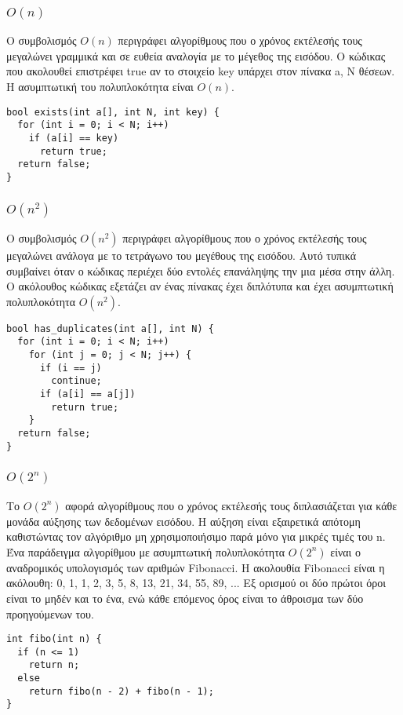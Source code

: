 \subsubsection{$O(n)$}
Ο συμβολισμός $O(n)$ περιγράφει αλγορίθμους που ο χρόνος εκτέλεσής τους  μεγαλώνει γραμμικά και σε ευθεία αναλογία με το μέγεθος της εισόδου. Ο κώδικας που ακολουθεί επιστρέφει true αν το στοιχείο key υπάρχει στον πίνακα a, Ν θέσεων. Η ασυμπτωτική του πολυπλοκότητα είναι $O(n)$.
\begin{lstlisting}
bool exists(int a[], int N, int key) {
  for (int i = 0; i < N; i++)
    if (a[i] == key)
      return true;
  return false;
}
\end{lstlisting}

\subsubsection{$O(n^2)$}
Ο συμβολισμός $O(n^2)$ περιγράφει αλγορίθμους που ο χρόνος εκτέλεσής τους  μεγαλώνει ανάλογα με το τετράγωνο του μεγέθους της εισόδου. Αυτό τυπικά συμβαίνει όταν ο κώδικας περιέχει δύο εντολές επανάληψης την μια μέσα στην άλλη. Ο ακόλουθος κώδικας εξετάζει αν ένας πίνακας έχει διπλότυπα και έχει ασυμπτωτική πολυπλοκότητα $O(n^2)$. 
\begin{lstlisting}
bool has_duplicates(int a[], int N) {
  for (int i = 0; i < N; i++)
    for (int j = 0; j < N; j++) {
      if (i == j)
        continue;
      if (a[i] == a[j])
        return true;
    }
  return false;
}
\end{lstlisting}

\subsubsection{$O(2^n)$}
Το $O(2^n)$ αφορά αλγορίθμους που ο χρόνος εκτέλεσής τους διπλασιάζεται για κάθε μονάδα αύξησης των δεδομένων εισόδου. Η αύξηση είναι εξαιρετικά απότομη καθιστώντας τον αλγόριθμο μη χρησιμοποιήσιμο παρά μόνο για μικρές τιμές του n. Ένα παράδειγμα αλγορίθμου με ασυμπτωτική πολυπλοκότητα $O(2^n)$ είναι ο αναδρομικός υπολογισμός των αριθμών Fibonacci. Η ακολουθία Fibonacci είναι η ακόλουθη: 0, 1, 1, 2, 3, 5, 8, 13, 21, 34, 55, 89, ... Εξ ορισμού οι δύο πρώτοι όροι είναι το μηδέν και το ένα, ενώ κάθε επόμενος όρος είναι το άθροισμα των δύο προηγούμενων του. 

\begin{lstlisting}
int fibo(int n) {
  if (n <= 1)
    return n;
  else
    return fibo(n - 2) + fibo(n - 1);
}
\end{lstlisting}

